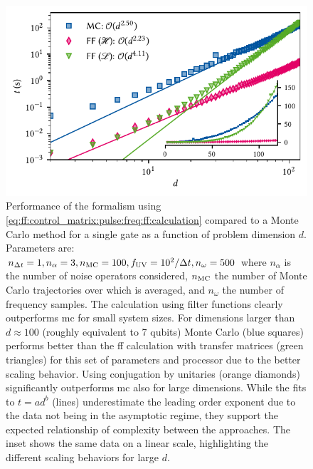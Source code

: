 \begin{figure}
    \centering
    \includegraphics[width=\textwidth]{img/pdf/filter_functions/benchmark_MC_vs_FF}
    \caption[]{
        Performance of the formalism using \cref{eq:ff:control_matrix:pulse:freq:ff:calculation} compared to a Monte Carlo method for a single gate as a function of problem dimension $d$.
        Parameters are: $n_{\Delta t} = \num{1}, n_\alpha = 3, n_{\mathrm{MC}} = 100, f_{\mathrm{UV}} = 10^2/\Delta t, n_\omega = \num{500}$ where $n_\alpha$ is the number of noise operators considered, $n_{\mathrm{MC}}$ the number of Monte Carlo trajectories over which is averaged, and $n_\omega$ the number of frequency samples.
        The calculation using filter functions clearly outperforms \gls{mc} for small system sizes.
        For dimensions larger than $d\approx\num{100}$ (roughly equivalent to 7 qubits) Monte Carlo (blue squares) performs better than the \gls{ff} calculation with transfer matrices (green triangles) for this set of parameters and processor due to the better scaling behavior.
        Using conjugation by unitaries (orange diamonds) significantly outperforms \gls{mc} also for large dimensions.
        While the fits to $t = a d^b$ (lines) underestimate the leading order exponent due to the data not being in the asymptotic regime, they support the expected relationship of complexity between the approaches.
        The inset shows the same data on a linear scale, highlighting the different scaling behaviors for large $d$.
    }
    \label{fig:ff:performance:MC_vs_FF}
\end{figure}

